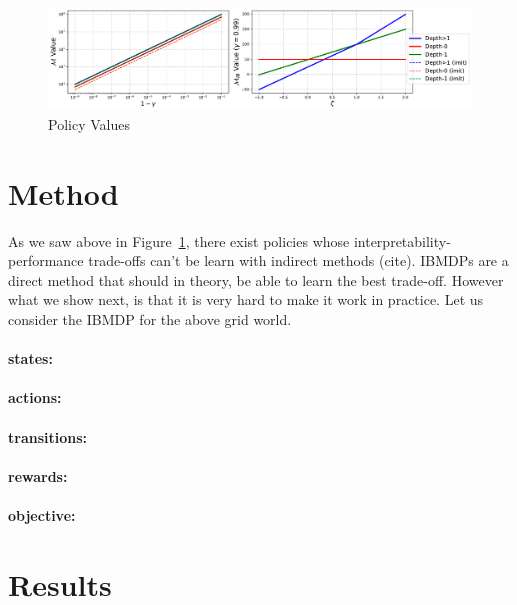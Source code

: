 \begin{figure}
    \centering
    \includegraphics[width=1\textwidth]{images/images_part1/policy_values_comparison.pdf}
    \caption{Policy Values}\label{fig:policy-values}
\end{figure}


\section{Method}

As we saw above in Figure~\ref{fig:policy-values}, there exist policies whose interpretability-performance trade-offs can't be learn with indirect methods (cite).
IBMDPs are a direct method that should in theory, be able to learn the best trade-off.
However what we show next, is that it is very hard to make it work in practice.
Let us consider the IBMDP for the above grid world.
\paragraph{states:}
\paragraph{actions:}
\paragraph{transitions:}
\paragraph{rewards:}
\paragraph{objective:}


\section{Results}
